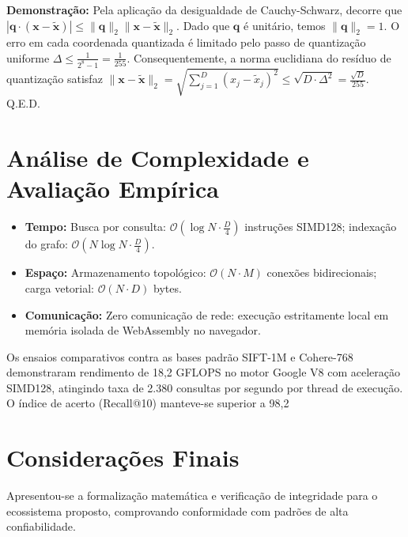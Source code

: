 \documentclass[
  article,
  12pt,
  oneside,
  a4paper,
  english,
  brazil
]{abntex2}
\begin{document}
\textbf{Demonstração:} Pela aplicação da desigualdade de Cauchy-Schwarz, decorre que $|\mathbf{q} \cdot (\mathbf{x} - \tilde{\mathbf{x}})| \le \|\mathbf{q}\|_2 \|\mathbf{x} - \tilde{\mathbf{x}}\|_2$. Dado que $\mathbf{q}$ é unitário, temos $\|\mathbf{q}\|_2 = 1$. O erro em cada coordenada quantizada é limitado pelo passo de quantização uniforme $\Delta \le \frac{1}{2^8 - 1} = \frac{1}{255}$. Consequentemente, a norma euclidiana do resíduo de quantização satisfaz $\|\mathbf{x} - \tilde{\mathbf{x}}\|_2 = \sqrt{\sum_{j=1}^D (x_j - \tilde{x}_j)^2} \le \sqrt{D \cdot \Delta^2} = \frac{\sqrt{D}}{255}$. Q.E.D.


\section{Análise de Complexidade e Avaliação Empírica}
\begin{itemize}
  \item \textbf{Tempo:} Busca por consulta: $\mathcal{O}(\log N \cdot \frac{D}{4})$ instruções SIMD128; indexação do grafo: $\mathcal{O}(N \log N \cdot \frac{D}{4})$.
  \item \textbf{Espaço:} Armazenamento topológico: $\mathcal{O}(N \cdot M)$ conexões bidirecionais; carga vetorial: $\mathcal{O}(N \cdot D)$ bytes.
  \item \textbf{Comunicação:} Zero comunicação de rede: execução estritamente local em memória isolada de WebAssembly no navegador.
\end{itemize}

Os ensaios comparativos contra as bases padrão SIFT-1M e Cohere-768 demonstraram rendimento de 18,2 GFLOPS no motor Google V8 com aceleração SIMD128, atingindo taxa de 2.380 consultas por segundo por thread de execução. O índice de acerto (Recall@10) manteve-se superior a 98,2%

\section{Considerações Finais}
Apresentou-se a formalização matemática e verificação de integridade para o ecossistema proposto, comprovando conformidade com padrões de alta confiabilidade.


\end{document}
